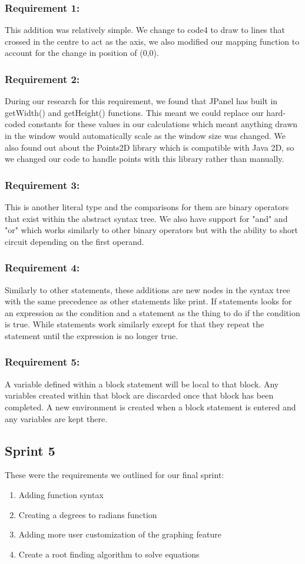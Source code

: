 \documentclass[a4paper, oneside, 11pt]{report}
\begin{document}
\subsubsection{Requirement 1:}
This addition was relatively simple. We change to code4 to draw to lines that crossed in the centre to act as the axis, we also modified our mapping function to account for  the change in position of (0,0).
\subsubsection{Requirement 2:}
During our research for this requirement, we found that JPanel has built in getWidth() and getHeight() functions. This meant we could replace our hard-coded constants for these values in our calculations which meant anything drawn in the window would automatically scale as the window size was changed.
We also found out about the Points2D library which is compatible with Java 2D, so we changed our code to handle points with this library rather than manually.
\subsubsection{Requirement 3:}
This is another literal type and the comparisons for them are binary operators that exist within the abstract syntax tree. We also have support for "and" and "or" which works similarly to other binary operators but with the ability to short circuit depending on the first operand.
\subsubsection{Requirement 4:}
Similarly to other statements, these additions are new nodes in the syntax tree with the same precedence as other statements like print. If statements looks for an expression as the condition and a statement as the thing to do if the condition is true. While statements work similarly except for that they repeat the statement until the expression is no longer true.
\subsubsection{Requirement 5:}
A variable defined within a block statement will be local to that block. Any variables created within that block are discarded once that block has been completed. A new environment is created when a block statement is entered and any variables are kept there.

\subsection{Sprint 5}
These were the requirements we outlined for our final sprint:
\begin{enumerate}
\item Adding function syntax
\item Creating a degrees to radians function
\item Adding more user customization of the graphing feature
\item Create a root finding algorithm to solve equations
\end{enumerate}
\end{document}
